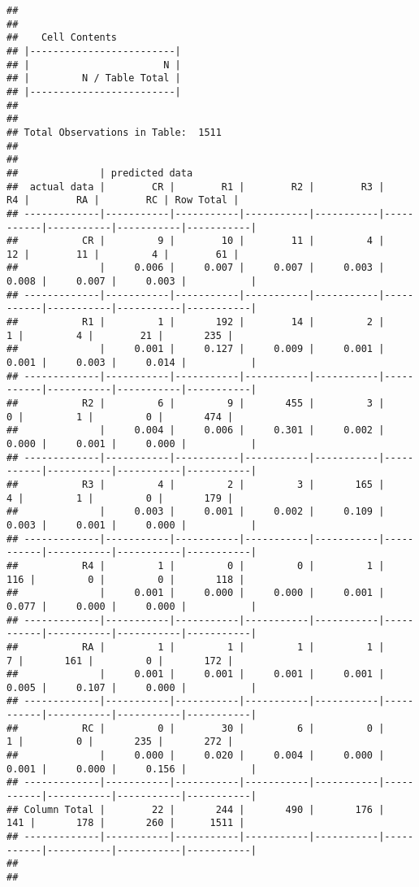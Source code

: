 \documentclass[
]{article}
\begin{document}
\begin{verbatim}
## 
##  
##    Cell Contents
## |-------------------------|
## |                       N |
## |         N / Table Total |
## |-------------------------|
## 
##  
## Total Observations in Table:  1511 
## 
##  
##              | predicted data 
##  actual data |        CR |        R1 |        R2 |        R3 |        R4 |        RA |        RC | Row Total | 
## -------------|-----------|-----------|-----------|-----------|-----------|-----------|-----------|-----------|
##           CR |         9 |        10 |        11 |         4 |        12 |        11 |         4 |        61 | 
##              |     0.006 |     0.007 |     0.007 |     0.003 |     0.008 |     0.007 |     0.003 |           | 
## -------------|-----------|-----------|-----------|-----------|-----------|-----------|-----------|-----------|
##           R1 |         1 |       192 |        14 |         2 |         1 |         4 |        21 |       235 | 
##              |     0.001 |     0.127 |     0.009 |     0.001 |     0.001 |     0.003 |     0.014 |           | 
## -------------|-----------|-----------|-----------|-----------|-----------|-----------|-----------|-----------|
##           R2 |         6 |         9 |       455 |         3 |         0 |         1 |         0 |       474 | 
##              |     0.004 |     0.006 |     0.301 |     0.002 |     0.000 |     0.001 |     0.000 |           | 
## -------------|-----------|-----------|-----------|-----------|-----------|-----------|-----------|-----------|
##           R3 |         4 |         2 |         3 |       165 |         4 |         1 |         0 |       179 | 
##              |     0.003 |     0.001 |     0.002 |     0.109 |     0.003 |     0.001 |     0.000 |           | 
## -------------|-----------|-----------|-----------|-----------|-----------|-----------|-----------|-----------|
##           R4 |         1 |         0 |         0 |         1 |       116 |         0 |         0 |       118 | 
##              |     0.001 |     0.000 |     0.000 |     0.001 |     0.077 |     0.000 |     0.000 |           | 
## -------------|-----------|-----------|-----------|-----------|-----------|-----------|-----------|-----------|
##           RA |         1 |         1 |         1 |         1 |         7 |       161 |         0 |       172 | 
##              |     0.001 |     0.001 |     0.001 |     0.001 |     0.005 |     0.107 |     0.000 |           | 
## -------------|-----------|-----------|-----------|-----------|-----------|-----------|-----------|-----------|
##           RC |         0 |        30 |         6 |         0 |         1 |         0 |       235 |       272 | 
##              |     0.000 |     0.020 |     0.004 |     0.000 |     0.001 |     0.000 |     0.156 |           | 
## -------------|-----------|-----------|-----------|-----------|-----------|-----------|-----------|-----------|
## Column Total |        22 |       244 |       490 |       176 |       141 |       178 |       260 |      1511 | 
## -------------|-----------|-----------|-----------|-----------|-----------|-----------|-----------|-----------|
## 
## 
\end{verbatim}
\end{document}
